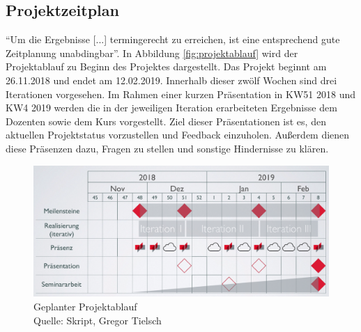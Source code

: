 	\subsection{Projektzeitplan}
	\enquote{Um die Ergebnisse [...] termingerecht zu erreichen, ist eine entsprechend gute Zeitplanung unabdingbar}\autocite[][S. 90]{projektmanagement}.
	In Abbildung \vref{fig:projektablauf} wird der Projektablauf zu Beginn des Projektes dargestellt. Das Projekt beginnt am 26.11.2018 und endet am 12.02.2019. Innerhalb dieser zwölf Wochen sind drei Iterationen vorgesehen. Im Rahmen einer kurzen Präsentation in KW51 2018 und KW4 2019 werden die in der jeweiligen Iteration erarbeiteten Ergebnisse dem Dozenten sowie dem Kurs vorgestellt. Ziel dieser Präsentationen ist es, den aktuellen Projektstatus vorzustellen und Feedback einzuholen. Außerdem dienen diese Präsenzen dazu, Fragen zu stellen und sonstige Hindernisse zu klären. 
	\begin{figure}[H]
		\centering 
		\includegraphics[width=12cm]{img/geplanterProjektablauf.png}
		\captionsetup{format=hang}
		\caption[Geplanter Projektablauf ]{\label{fig:projektablauf} Geplanter Projektablauf \\ Quelle: Skript, Gregor Tielsch }
	\end{figure}
	
